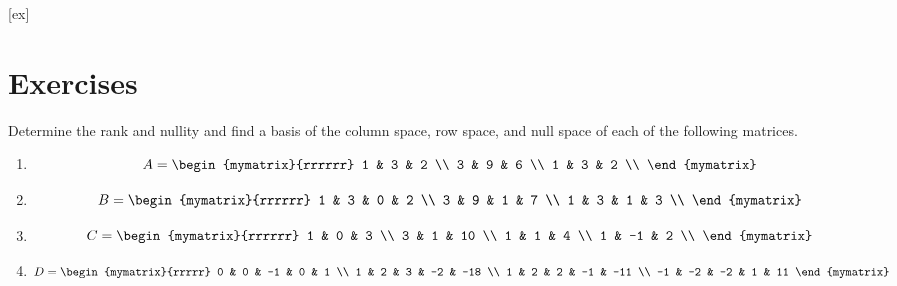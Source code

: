 [ex]
\section*{Exercises}

\begin{enumialphparenastyle}

\begin{ex}
  Determine the rank and nullity and find a basis of the column
  space, row space, and null space of each of the following matrices.
  \begin{enumerate}
  \item
    \begin{equation*}
      A = \begin{mymatrix}{rrrrrr}
        1 & 3 & 2 \\ 
        3 & 9 & 6 \\ 
        1 & 3 & 2 \\
      \end{mymatrix} 
    \end{equation*}
  \item
    \begin{equation*}
      B = \begin{mymatrix}{rrrrrr}
        1 & 3 & 0 & 2 \\
        3 & 9 & 1 & 7 \\
        1 & 3 & 1 & 3 \\
      \end{mymatrix} 
    \end{equation*}
  \item
    \begin{equation*}
      C = \begin{mymatrix}{rrrrrr}
        1 & 0 & 3 \\
        3 & 1 & 10 \\
        1 & 1 & 4 \\
        1 & -1 & 2 \\
      \end{mymatrix}
    \end{equation*}
  \item
    \begin{equation*}
      D = \begin{mymatrix}{rrrrr}
        0 & 0 & -1 & 0 & 1 \\ 
        1 & 2 & 3 & -2 & -18 \\ 
        1 & 2 & 2 & -1 & -11 \\ 
        -1 & -2 & -2 & 1 & 11
      \end{mymatrix}

\end{equation*}
\end{enumerate}
\end{ex}
\end{enumialphparenastyle}
